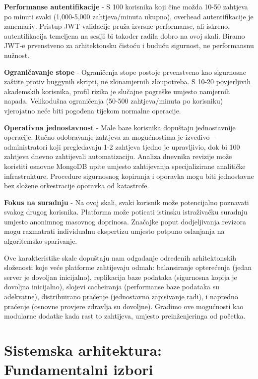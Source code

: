 \documentclass[12pt,a4paper]{article}
\begin{document}
\textbf{Performanse autentifikacije} - S 100 korisnika koji čine možda 10-50 zahtjeva po minuti svaki (1,000-5,000 zahtjeva/minuta ukupno), overhead autentifikacije je zanemariv. Pristup JWT validacije pruža izvrsne performanse, ali iskreno, autentifikacija temeljena na sesiji bi također radila dobro na ovoj skali. Biramo JWT-e prvenstveno za arhitektonsku čistoću i buduću sigurnost, ne performansnu nužnost.

\textbf{Ograničavanje stope} - Ograničenja stope postoje prvenstveno kao sigurnosne zaštite protiv buggynih skripti, ne zlonamjernih zloupotreba. S 10-20 povjerljivih akademskih korisnika, profil rizika je slučajne pogreške umjesto namjernih napada. Velikodušna ograničenja (50-500 zahtjeva/minuta po korisniku) vjerojatno neće biti pogođena tijekom normalne operacije.

\textbf{Operativna jednostavnost} - Male baze korisnika dopuštaju jednostavnije operacije. Ručno odobravanje zahtjeva za mogućnostima je izvedivo—administratori koji pregledavaju 1-2 zahtjeva tjedno je upravljivio, dok bi 100 zahtjeva dnevno zahtijevali automatizaciju. Analiza dnevnika revizije može koristiti osnovne MongoDB upite umjesto zahtijevanja specijalizirane analitičke infrastrukture. Procedure sigurnosnog kopiranja i oporavka mogu biti jednostavne bez složene orkestracije oporavka od katastrofe.

\textbf{Fokus na suradnju} - Na ovoj skali, svaki korisnik može potencijalno poznavati svakog drugog korisnika. Platforma može poticati istinsku istraživačku suradnju umjesto anonimnog masovnog doprinosa. Značajke poput dodjeljivanja revizora mogu razmatrati individualnu ekspertizu umjesto potpuno oslanjanja na algoritemsko sparivanje.

Ove karakteristike skale dopuštaju nam odgađanje određenih arhitektonskih složenosti koje veće platforme zahtijevaju odmah: balansiranje opterećenja (jedan server je dovoljan inicijalno), replikacija baze podataka (sigurnosna kopija je dovoljna inicijalno), slojevi cacheiranja (performanse baze podataka su adekvatne), distribuirano praćenje (jednostavno zapisivanje radi), i napredno praćenje (osnovne provjere zdravlja su dovoljne). Gradimo ove mogućnosti kao modularne dodatke kada rast to zahtijeva, umjesto preinženjeringa od početka.

\section{Sistemska arhitektura: Fundamentalni izbori}
\end{document}
